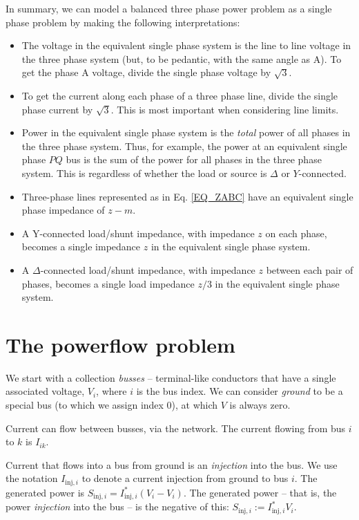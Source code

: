 \documentclass[11pt]{article}
\begin{document}
In summary, we can model a balanced three phase power problem as a single phase problem by making the following interpretations:
\begin{itemize}
	\item The voltage in the equivalent single phase system is the line to line voltage in the three phase system (but, to be pedantic, with the same angle as A). To get the phase A voltage, divide the single phase voltage by $\sqrt{3}$.
	\item To get the current along each phase of a three phase line, divide the single phase current by $\sqrt{3}$. This is most important when considering line limits.
	\item Power in the equivalent single phase system is the \emph{total} power of all phases in the three phase system. Thus, for example, the power at an equivalent single phase $PQ$ bus is the sum of the power for all phases in the three phase system. This is regardless of whether the load or source is $\Delta$ or $Y$-connected.
	\item Three-phase lines represented as in Eq. \ref{EQ_ZABC} have an equivalent single phase impedance of $z - m$.
	\item A Y-connected load/shunt impedance, with impedance $z$ on each phase, becomes a single impedance $z$ in the equivalent single phase system.
	\item A $\Delta$-connected load/shunt impedance, with impedance $z$ between each pair of phases, becomes a single load impedance $z/3$ in the equivalent single phase system.
	
\end{itemize}

\section{The powerflow problem}

We start with a collection \emph{busses} -- terminal-like conductors that have a single associated voltage, $V_i$, where $i$ is the bus index. We can consider \emph{ground} to be a special bus (to which we assign index 0), at which $V$ is always zero.

Current can flow between busses, via the network. The current flowing from bus $i$ to $k$ is $I_{ik}$. 

Current that flows into a bus from ground is an \emph{injection} into the bus. We use the notation $I_{\text{inj},i}$ to denote a current injection from ground to bus $i$. The generated power is $S_{\text{inj}, i} = I_{\text{inj}, i}^*(V_i - V_i)$. The generated power -- that is, the power \emph{injection} into the bus -- is the negative of this: $S_{\text{inj},i} := I_{\text{inj},i}^*V_i$.
\end{document}
